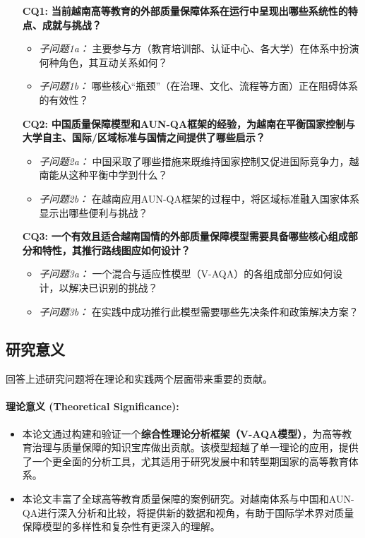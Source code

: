 \begin{enumerate}
    \item[\textbf{CQ1:}] \textbf{当前越南高等教育的外部质量保障体系在运行中呈现出哪些系统性的特点、成就与挑战？}
    \begin{itemize}
        \item \textit{子问题1a：} 主要参与方（教育培训部、认证中心、各大学）在体系中扮演何种角色，其互动关系如何？
        \item \textit{子问题1b：} 哪些核心“瓶颈”（在治理、文化、流程等方面）正在阻碍体系的有效性？
    \end{itemize}

    \item[\textbf{CQ2:}] \textbf{中国质量保障模型和AUN-QA框架的经验，为越南在平衡国家控制与大学自主、国际/区域标准与国情之间提供了哪些启示？}
    \begin{itemize}
        \item \textit{子问题2a：} 中国采取了哪些措施来既维持国家控制又促进国际竞争力，越南能从这种平衡中学到什么？
        \item \textit{子问题2b：} 在越南应用AUN-QA框架的过程中，将区域标准融入国家体系显示出哪些便利与挑战？
    \end{itemize}

    \item[\textbf{CQ3:}] \textbf{一个有效且适合越南国情的外部质量保障模型需要具备哪些核心组成部分和特性，其推行路线图应如何设计？}
    \begin{itemize}
        \item \textit{子问题3a：} 一个混合与适应性模型（V-AQA）的各组成部分应如何设计，以解决已识别的挑战？
        \item \textit{子问题3b：} 在实践中成功推行此模型需要哪些先决条件和政策解决方案？
    \end{itemize}
\end{enumerate}

\subsection{研究意义}
\label{subsec:y_nghia_nghien_cuu}

回答上述研究问题将在理论和实践两个层面带来重要的贡献。

\paragraph{理论意义 (Theoretical Significance):}
\begin{itemize}
    \item 本论文通过构建和验证一个\textbf{综合性理论分析框架（V-AQA模型）}，为高等教育治理与质量保障的知识宝库做出贡献。该模型超越了单一理论的应用，提供了一个更全面的分析工具，尤其适用于研究发展中和转型期国家的高等教育体系。
    \item 本论文丰富了全球高等教育质量保障的案例研究。对越南体系与中国和AUN-QA进行深入分析和比较，将提供新的数据和视角，有助于国际学术界对质量保障模型的多样性和复杂性有更深入的理解。
\end{itemize}

